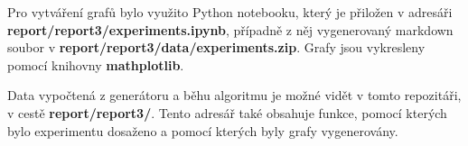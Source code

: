 \documentclass[a4paper,10pt,twocolumn]{article}
\begin{document}
Pro vytváření grafů bylo využito Python notebooku, který je přiložen v adresáři \textbf{report/report3/experiments.ipynb}, případně z něj vygenerovaný markdown soubor v \textbf{report/report3/data/experiments.zip}. Grafy jsou vykresleny pomocí knihovny \textbf{mathplotlib}.

Data vypočtená z generátoru a běhu algoritmu je možné vidět v tomto repozitáři, v cestě \textbf{report/report3/}. Tento adresář také obsahuje funkce, pomocí kterých bylo experimentu dosaženo a pomocí kterých byly grafy vygenerovány.








\end{document}
